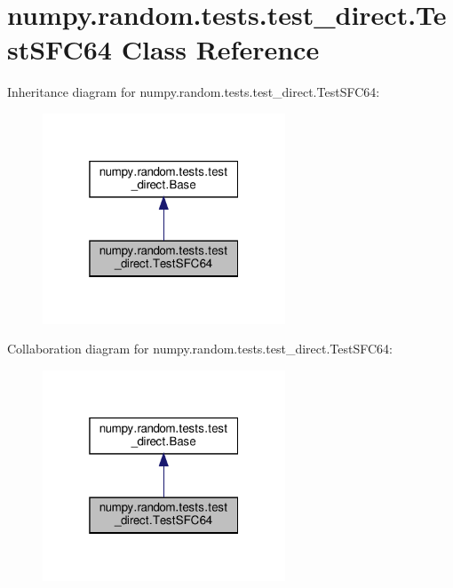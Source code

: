 \hypertarget{classnumpy_1_1random_1_1tests_1_1test__direct_1_1TestSFC64}{}\section{numpy.\+random.\+tests.\+test\+\_\+direct.\+Test\+S\+F\+C64 Class Reference}
\label{classnumpy_1_1random_1_1tests_1_1test__direct_1_1TestSFC64}


Inheritance diagram for numpy.\+random.\+tests.\+test\+\_\+direct.\+Test\+S\+F\+C64\+:
\nopagebreak
\begin{figure}[H]
\begin{center}
\leavevmode
\includegraphics[width=205pt]{classnumpy_1_1random_1_1tests_1_1test__direct_1_1TestSFC64__inherit__graph}
\end{center}
\end{figure}


Collaboration diagram for numpy.\+random.\+tests.\+test\+\_\+direct.\+Test\+S\+F\+C64\+:
\nopagebreak
\begin{figure}[H]
\begin{center}
\leavevmode
\includegraphics[width=205pt]{classnumpy_1_1random_1_1tests_1_1test__direct_1_1TestSFC64__coll__graph}
\end{center}
\end{figure}
